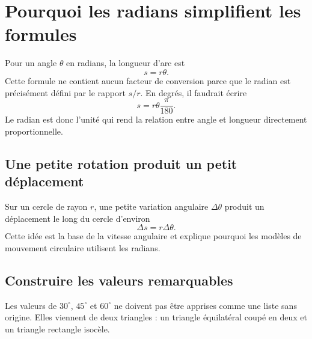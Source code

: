 \documentclass[12pt,a4paper,openany]{book}
\begin{document}
\section{Pourquoi les radians simplifient les formules}

Pour un angle $\theta$ en radians, la longueur d'arc est
\[
s=r\theta.
\]
Cette formule ne contient aucun facteur de conversion parce que le radian est précisément défini par le rapport $s/r$. En degrés, il faudrait écrire
\[
s=r\theta\frac{\pi}{180}.
\]
Le radian est donc l'unité qui rend la relation entre angle et longueur directement proportionnelle.

\subsection{Une petite rotation produit un petit déplacement}
Sur un cercle de rayon $r$, une petite variation angulaire $\Delta\theta$ produit un déplacement le long du cercle d'environ
\[
\Delta s=r\Delta\theta.
\]
Cette idée est la base de la vitesse angulaire et explique pourquoi les modèles de mouvement circulaire utilisent les radians.

\begin{center}
\end{center}

\subsection{Construire les valeurs remarquables}
Les valeurs de $30^\circ$, $45^\circ$ et $60^\circ$ ne doivent pas être apprises comme une liste sans origine. Elles viennent de deux triangles : un triangle équilatéral coupé en deux et un triangle rectangle isocèle.

\begin{center}
\qquad
{}
\end{center}
\end{document}
